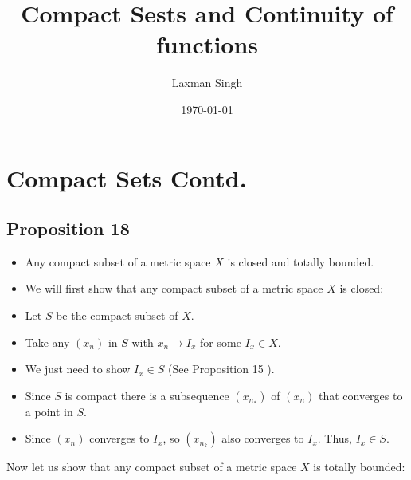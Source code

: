 \documentclass[12pt,a4paper]{article}
\author{Laxman Singh}
\date{\today}
\title{Compact Sests and Continuity of functions }
\begin{document}
\section{Compact Sets Contd.} 
\subsection{Proposition 18}
\begin{itemize}
    \item Any compact subset of a metric space \(X\) is closed and totally bounded.
\end{itemize}
\begin{itemize}
    \item We will first show that any compact subset of a metric space \(X\) is closed:
    \item Let \(S\) be the compact subset of \(X\).
    \item Take any \(\left(x_n\right)\) in \(S\) with \(x_n \rightarrow I_x\) for some \(I_x \in X\).
    \item We just need to show \(I_x \in S\) (See Proposition 15 ).
    \item Since \(S\) is compact there is a subsequence \(\left(x_{n_*}\right)\) of \(\left(x_n\right)\) that converges to a point in \(S\).
    \item Since \(\left(x_n\right)\) converges to \(I_x\), so \(\left(x_{n_k}\right)\) also converges to \(I_x\). Thus, \(I_x \in S\).
\end{itemize}
Now let us show that any compact subset of a metric space \(X\) is totally bounded:
\end{document}
